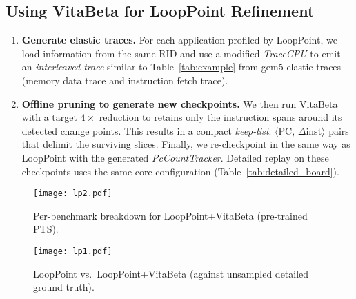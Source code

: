 \subsection{Using VitaBeta  for {LoopPoint Refinement}}
\begin{enumerate}[nosep, leftmargin=*]
\item \textbf{Generate elastic traces.}  
For each application profiled by LoopPoint, we load information from the same RID and use a modified \textit{TraceCPU} to  emit an \textit{interleaved trace} similar to Table~\ref{tab:example} from gem5 elastic traces\cite{elastic_trace_gem5} (memory data trace and instruction fetch trace).
\item \textbf{Offline pruning to generate new checkpoints.}  
    We then run VitaBeta with a target $4\times$ reduction to retains only the
      instruction spans around its detected change points. This results in a compact \emph{keep-list}:
      \(\langle\text{PC},\,\Delta\text{inst}\rangle\) pairs that delimit the surviving slices. Finally, we re-checkpoint in the same way as LoopPoint with the generated \textit{PcCountTracker}. Detailed replay on these checkpoints uses the same core configuration (Table~\ref{tab:detailed_board}).
\end{enumerate} 
\begin{figure*}[!htbp] 
    \centering
    \texttt{[image: lp2.pdf]}
    \caption{Per-benchmark breakdown for LoopPoint+VitaBeta (pre-trained PTS).}
    \label{fig:lp_vb_breakdown} 
\end{figure*}
\begin{figure}[!htbp] 
    \centering
    \texttt{[image: lp1.pdf]}
    \caption{LoopPoint vs.\ LoopPoint+VitaBeta (against unsampled detailed ground truth).}
    \label{fig:lp_vb_comparison} 
\end{figure}
